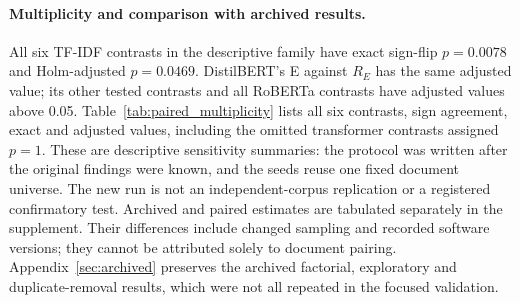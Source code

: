\paragraph{Multiplicity and comparison with archived results.}
All six TF-IDF contrasts in the descriptive family have exact sign-flip $p=0.0078$ and Holm-adjusted $p=0.0469$. DistilBERT's E against $R_E$ has the same adjusted value; its other tested contrasts and all RoBERTa contrasts have adjusted values above 0.05. Table~\ref{tab:paired_multiplicity} lists all six contrasts, sign agreement, exact and adjusted values, including the omitted transformer contrasts assigned $p=1$. These are descriptive sensitivity summaries: the protocol was written after the original findings were known, and the seeds reuse one fixed document universe. The new run is not an independent-corpus replication or a registered confirmatory test. Archived and paired estimates are tabulated separately in the supplement. Their differences include changed sampling and recorded software versions; they cannot be attributed solely to document pairing. Appendix~\ref{sec:archived} preserves the archived factorial, exploratory and duplicate-removal results, which were not all repeated in the focused validation.
